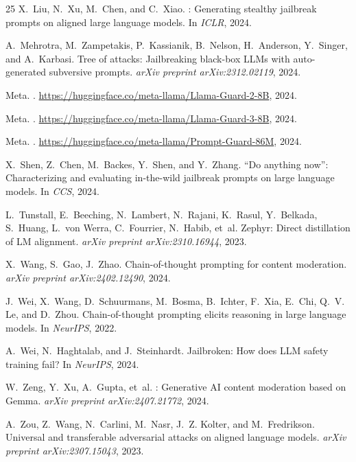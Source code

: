 \documentclass[11pt]{article}
\begin{document}
\begin{thebibliography}{25}
X.~Liu, N.~Xu, M.~Chen, and C.~Xiao.
: Generating stealthy jailbreak prompts on aligned large language models.
\newblock In \emph{ICLR}, 2024.

A.~Mehrotra, M.~Zampetakis, P.~Kassianik, B.~Nelson, H.~Anderson, Y.~Singer, and A.~Karbasi.
\newblock Tree of attacks: Jailbreaking black-box {LLMs} with auto-generated subversive prompts.
\newblock \emph{arXiv preprint arXiv:2312.02119}, 2024.

Meta.
.
\newblock \url{https://huggingface.co/meta-llama/Llama-Guard-2-8B}, 2024.

Meta.
.
\newblock \url{https://huggingface.co/meta-llama/Llama-Guard-3-8B}, 2024.

Meta.
.
\newblock \url{https://huggingface.co/meta-llama/Prompt-Guard-86M}, 2024.

X.~Shen, Z.~Chen, M.~Backes, Y.~Shen, and Y.~Zhang.
\newblock ``{D}o anything now'': Characterizing and evaluating in-the-wild jailbreak prompts on large language models.
\newblock In \emph{CCS}, 2024.

L.~Tunstall, E.~Beeching, N.~Lambert, N.~Rajani, K.~Rasul, Y.~Belkada, S.~Huang, L.~von Werra, C.~Fourrier, N.~Habib, et~al.
\newblock Zephyr: Direct distillation of {LM} alignment.
\newblock \emph{arXiv preprint arXiv:2310.16944}, 2023.

X.~Wang, S.~Gao, J.~Zhao.
\newblock Chain-of-thought prompting for content moderation.
\newblock \emph{arXiv preprint arXiv:2402.12490}, 2024.

J.~Wei, X.~Wang, D.~Schuurmans, M.~Bosma, B.~Ichter, F.~Xia, E.~Chi, Q.~V. Le, and D.~Zhou.
\newblock Chain-of-thought prompting elicits reasoning in large language models.
\newblock In \emph{NeurIPS}, 2022.

A.~Wei, N.~Haghtalab, and J.~Steinhardt.
\newblock Jailbroken: How does {LLM} safety training fail?
\newblock In \emph{NeurIPS}, 2024.

W.~Zeng, Y.~Xu, A.~Gupta, et~al.
: Generative {AI} content moderation based on {Gemma}.
\newblock \emph{arXiv preprint arXiv:2407.21772}, 2024.

A.~Zou, Z.~Wang, N.~Carlini, M.~Nasr, J.~Z. Kolter, and M.~Fredrikson.
\newblock Universal and transferable adversarial attacks on aligned language models.
\newblock \emph{arXiv preprint arXiv:2307.15043}, 2023.

\end{thebibliography}
\end{document}
